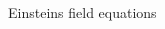 \documentclass{beamer}
\begin{document}
\begin{frame}{Einsteins field equations}
  \begin{columns}
    \begin{column}{0.5\textwidth}
      \begin{itemize}


\end{itemize}
\end{column}
\end{columns}
\end{frame}
\end{document}
